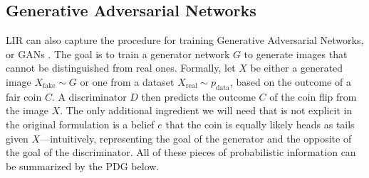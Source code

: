 \documentclass[twoside]{article}
\let\cite\citep
\theoremstyle{plain}
\theoremstyle{definition}
\theoremstyle{remark}
\begin{document}
\subsection{Generative Adversarial Networks}
\def\pdata{p_{\mathrm{data}}}
\def\real{{\mathrm{real}}}
\def\fake{{\mathrm{fake}}}
LIR can also capture the procedure for training Generative Adversarial Networks, or GANs \cite{goodfellow2020generative}.
The goal is to train a generator network $G$ to generate images that cannot be distinguished
   from real ones.
%
Formally, let $X$ be either a generated image $X_{\fake}\sim G$ or one from a dataset
$X_\real \sim \pdata$, based on the outcome of a fair coin $C$.
A discriminator $D$ then predicts the outcome $C$ of the coin flip from the image $X$.
%
The only additional ingredient we will need that is not explicit in the original formulation is a belief $e$ that the coin is equally likely heads as tails given $X$---intuitively, representing the goal of the generator and the opposite of the goal of the discriminator.
All of these pieces of probabilistic information can be summarized by the PDG below.
%
\end{document}
